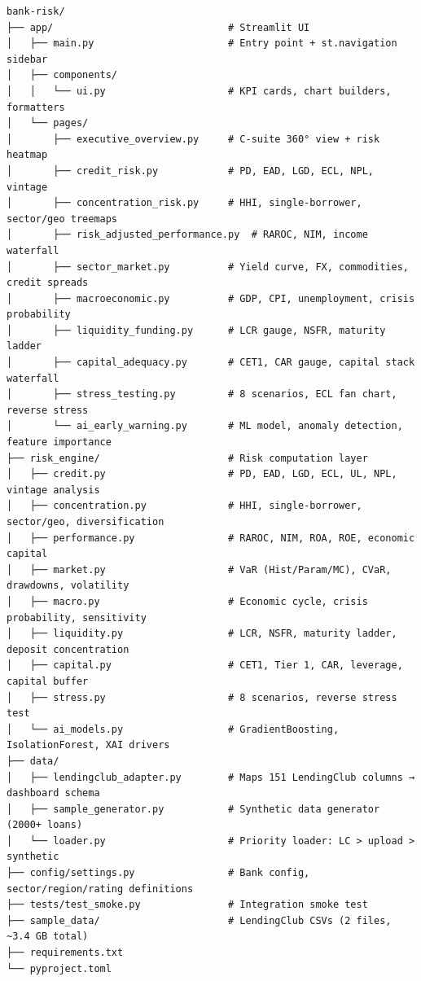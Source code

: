 \documentclass[12pt,a4paper]{article}
\begin{document}
{\small
\begin{lstlisting}[language={},basicstyle=\ttfamily\scriptsize]
bank-risk/
├── app/                              # Streamlit UI
│   ├── main.py                       # Entry point + st.navigation sidebar
│   ├── components/
│   │   └── ui.py                     # KPI cards, chart builders, formatters
│   └── pages/
│       ├── executive_overview.py     # C-suite 360° view + risk heatmap
│       ├── credit_risk.py            # PD, EAD, LGD, ECL, NPL, vintage
│       ├── concentration_risk.py     # HHI, single-borrower, sector/geo treemaps
│       ├── risk_adjusted_performance.py  # RAROC, NIM, income waterfall
│       ├── sector_market.py          # Yield curve, FX, commodities, credit spreads
│       ├── macroeconomic.py          # GDP, CPI, unemployment, crisis probability
│       ├── liquidity_funding.py      # LCR gauge, NSFR, maturity ladder
│       ├── capital_adequacy.py       # CET1, CAR gauge, capital stack waterfall
│       ├── stress_testing.py         # 8 scenarios, ECL fan chart, reverse stress
│       └── ai_early_warning.py       # ML model, anomaly detection, feature importance
├── risk_engine/                      # Risk computation layer
│   ├── credit.py                     # PD, EAD, LGD, ECL, UL, NPL, vintage analysis
│   ├── concentration.py              # HHI, single-borrower, sector/geo, diversification
│   ├── performance.py                # RAROC, NIM, ROA, ROE, economic capital
│   ├── market.py                     # VaR (Hist/Param/MC), CVaR, drawdowns, volatility
│   ├── macro.py                      # Economic cycle, crisis probability, sensitivity
│   ├── liquidity.py                  # LCR, NSFR, maturity ladder, deposit concentration
│   ├── capital.py                    # CET1, Tier 1, CAR, leverage, capital buffer
│   ├── stress.py                     # 8 scenarios, reverse stress test
│   └── ai_models.py                  # GradientBoosting, IsolationForest, XAI drivers
├── data/
│   ├── lendingclub_adapter.py        # Maps 151 LendingClub columns → dashboard schema
│   ├── sample_generator.py           # Synthetic data generator (2000+ loans)
│   └── loader.py                     # Priority loader: LC > upload > synthetic
├── config/settings.py                # Bank config, sector/region/rating definitions
├── tests/test_smoke.py               # Integration smoke test
├── sample_data/                      # LendingClub CSVs (2 files, ~3.4 GB total)
├── requirements.txt
└── pyproject.toml
\end{lstlisting}
}
\end{document}

